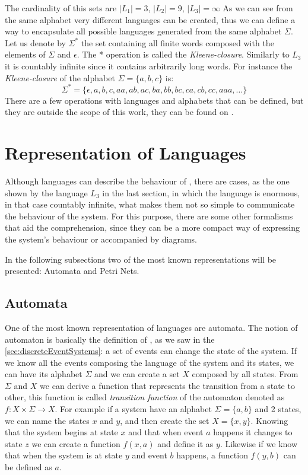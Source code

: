 The cardinality of this sets are $|L_1|=3$, $|L_2|=9$, $|L_3|=\infty$
As we can see from the same alphabet very different languages can be created, thus we can define a way to encapsulate all possible languages generated from
the same alphabet $\Sigma$. Let us denote by $\Sigma^*$ the set containing all
finite words composed with the elements of $\Sigma$ and $\epsilon$. The *
operation is called the \textit{Kleene-closure}. Similarly to $L_3$ it is
countably infinite since it contains arbitrarily long words. For instance the
\textit{Kleene-closure} of the alphabet $\Sigma = \{a, b, c\}$ is:
\begin{equation*}
  \label{eq:kleeneExample}
  \Sigma^* = \{\epsilon,a,b,c,aa,ab,ac,ba,bb,bc,ca,cb,cc,aaa,\dots\} 
\end{equation*}
There are a few operations with languages and alphabets that can be defined, but they are outside the scope of this work, they can be found on \cite{cassandras2009introduction}.
\section{Representation of Languages}
\label{sec:representationLanguages}

Although languages can describe the behaviour of \DESs, there are cases, as the
one shown
by the language $L_3$ in the last section, in which the language is enormous, in
that case countably infinite, what makes them not so simple to communicate the
behaviour of the system. For this purpose, there are some other formalisms that
aid the comprehension, since they can be a more compact way of expressing the
system's behaviour or accompanied by diagrams.

In the following subsections two of the most known representations will be
presented: Automata and Petri Nets.

\pagebreak
\subsection{Automata}
\label{sec:automata}
One of the most known representation of languages are automata. The notion of
automaton is basically the definition of \DESs, as we saw in the
\autoref{sec:discreteEventSystems}: a set of events can change the state of the
system. If we know all the events composing the language of the
system and its states, we can have its alphabet $\Sigma$ and we can create a set $X$ composed
by all states.
From $\Sigma$ and $X$ we can derive a function that represents the transition
from a state to other, this function is called \emph{transition function} of the automaton
denoted as $f : X \times \Sigma \rightarrow X$. For example if a system have an
alphabet $\Sigma = \{a,b\}$ and 2 states, we can name the states $x$ and
$y$, and then create the set $X = \{x,y\}$. Knowing that the system begins at state $x$
and that when event $a$ happens it changes to state $z$ we can create a function
$f(x,a)$ and define it as $y$. Likewise if we know that when the system is at
state $y$ and event $b$ happens, a function $f(y,b)$ can be defined as $a$.


